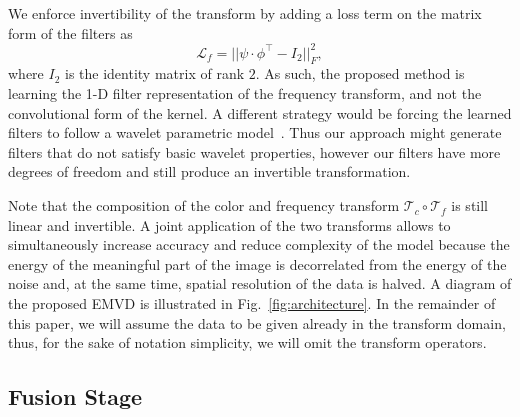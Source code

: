 \documentclass[final]{cvpr}
\begin{document}
    We enforce invertibility of the transform by adding a loss term on the matrix form of the filters as
    \begin{equation}
        \mathcal{L}_f = \big\lvert\big\lvert \psi \cdot \phi^\top - I_2 \big\rvert\big\rvert_F^2,
        \label{eq:frequency_loss}
    \end{equation}
    where $I_2$ is the identity matrix of rank $2$. As such, the proposed method is learning the 1-D filter representation of the frequency transform, and not the convolutional form of the kernel. A different strategy would be forcing the learned filters to follow a wavelet parametric model~\cite{wolter2020wavelet}. Thus our approach might generate filters that do not satisfy basic wavelet properties, however our filters have more degrees of freedom and still produce an invertible transformation.
    
    Note that the composition of the color and frequency transform $\mathcal{T}_c \circ \mathcal{T}_f$ is still linear and invertible. A joint application of the two transforms allows to simultaneously increase accuracy and reduce complexity of the model because the energy of the meaningful part of the image is decorrelated from the energy of the noise and, at the same time, spatial resolution of the data is halved. A diagram of the proposed EMVD is illustrated in Fig.~\ref{fig:architecture}. In the remainder of this paper, we will assume the data to be given already in the transform domain, thus, for the sake of notation simplicity, we will omit the transform operators.
    
    \subsection{Fusion Stage}
    \label{section:fusion}
    
\end{document}
